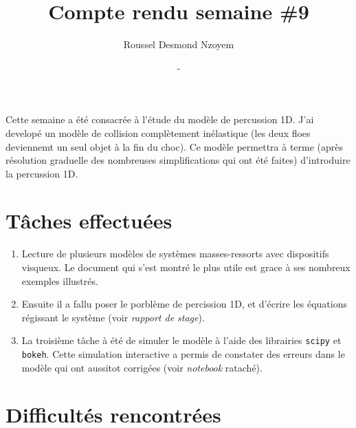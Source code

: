\documentclass[
  french,
	11pt, %
]{fphw}
\title{Compte rendu semaine \#9} %
\author{Roussel Desmond Nzoyem} %
\date{\DTMdisplaydate{2021}{3}{31}{-1} - \DTMdisplaydate{2021}{4}{06}{-1}} %
\institute{Sorbonne Université \\ Laboratoire Jacques-Louis Lions} %
\begin{document}
\maketitle %



Cette semaine a été consacrée à l'étude du modèle de percussion 1D. J'ai developé un modèle de collision complètement inélastique (les deux floes deviennemt un seul objet à la fin du choc). Ce modèle permettra à terme (après résolution graduelle des nombreuses simplifications qui ont été faites) d'introduire la percussion 1D.





\section*{Tâches effectuées}

\begin{enumerate}
  \item Lecture de plusieurs modèles de systèmes masses-ressorts avec dispositifs visqueux. Le document qui s'est montré le plus utile est \parencite{homodeling} grace à ses nombreux exemples illustrés.
  \item Ensuite il a fallu poser le porblème de percission 1D, et d'écrire les équations régissant le système (voir \textit{rapport de stage}).
  \item La troisième tâche à été de simuler le modèle à l'aide des librairies \verb|scipy| et \verb|bokeh|. Cette simulation interactive a permis de constater des erreurs dans le modèle qui ont aussitot corrigées (voir \textit{notebook} rataché). 
\end{enumerate}



\section*{Difficultés rencontrées}
\end{document}
